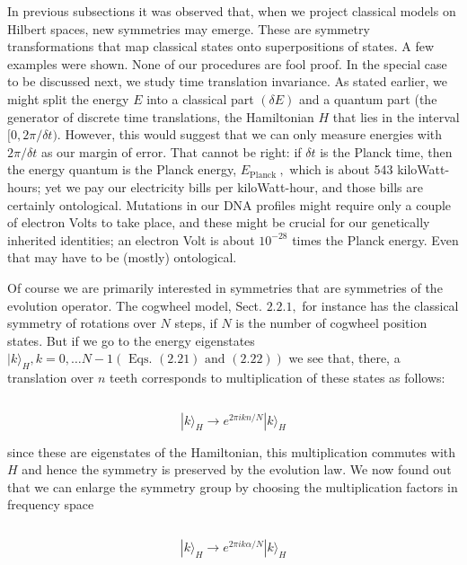 \documentclass[main.tex]{subfiles}
\begin{document}
In previous subsections it was observed that, when we project classical models on Hilbert spaces, new symmetries may emerge. These are symmetry transformations that map classical states onto superpositions of states. A few examples were shown. None of our procedures are fool proof. In the special case to be discussed next, we study time translation invariance. As stated earlier, we might split the energy
$E$ into a classical part $(\delta E)$ and a quantum part (the generator of discrete time translations, the Hamiltonian $H$ that lies in the interval $[0,2 \pi / \delta t) .$ However, this would suggest that we can only measure energies with $2 \pi / \delta t$ as our margin of error. That cannot be right: if $\delta t$ is the Planck time, then the energy quantum is the Planck energy, $E_{\text {Planck }},$ which is about 543 kiloWatt-hours; yet we pay our electricity bills per kiloWatt-hour, and those bills are certainly ontological. Mutations in our DNA profiles might require only a couple of electron Volts to take place, and these might be crucial for our genetically inherited identities; an electron Volt is about $10^{-28}$ times the Planck energy. Even that may have to be (mostly) ontological.

Of course we are primarily interested in symmetries that are symmetries of the evolution operator. The cogwheel model, Sect. $2.2 .1,$ for instance has the classical symmetry of rotations over $N$ steps, if $N$ is the number of cogwheel position states. But if we go to the energy eigenstates $|k\rangle_{H}, k=0, \ldots N-1(\text { Eqs. }(2.21) \text { and }(2.22))$ we see that, there, a translation over $n$ teeth corresponds to multiplication of these states as follows:

\begin{equation}\label{}
	
\end{equation}

$$
|k\rangle_{H} \rightarrow e^{2 \pi i k n / N}|k\rangle_{H}
$$

since these are eigenstates of the Hamiltonian, this multiplication commutes with
$H$ and hence the symmetry is preserved by the evolution law. We now found out that we can enlarge the symmetry group by choosing the multiplication factors in frequency space

\begin{equation}\label{}
	
\end{equation}


$$
|k\rangle_{H} \rightarrow e^{2 \pi i k \alpha / N}|k\rangle_{H}
$$
\end{document}
